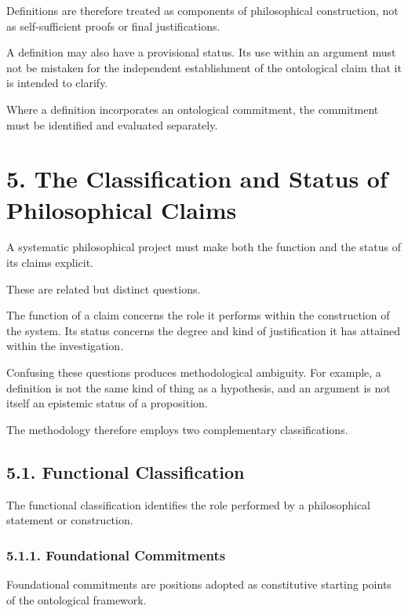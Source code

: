 Definitions are therefore treated as
components of philosophical construction,
not as self-sufficient proofs or final
justifications.

A definition may also have a provisional
status. Its use within an argument must
not be mistaken for the independent
establishment of the ontological claim
that it is intended to clarify.

Where a definition incorporates an
ontological commitment, the commitment
must be identified and evaluated separately.


\section*{5. The Classification and Status of Philosophical Claims}

A systematic philosophical project must
make both the function and the status
of its claims explicit.

These are related but distinct questions.

The function of a claim concerns the
role it performs within the construction
of the system. Its status concerns
the degree and kind of justification
it has attained within the investigation.

Confusing these questions produces
methodological ambiguity. For example,
a definition is not the same kind
of thing as a hypothesis, and an
argument is not itself an epistemic
status of a proposition.

The methodology therefore employs
two complementary classifications.

\subsection*{5.1. Functional Classification}

The functional classification identifies
the role performed by a philosophical
statement or construction.

\subsubsection*{5.1.1. Foundational Commitments}

Foundational commitments are positions
adopted as constitutive starting points
of the ontological framework.

